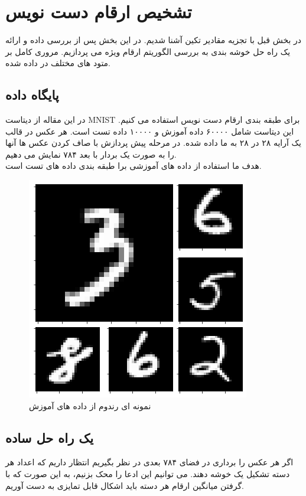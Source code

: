 	\section{تشخیص ارقام دست نویس}
	در بخش قبل با تجزیه مقادیر تکین آشنا شدیم. در این بخش 
	پس از بررسی داده و ارائه یک راه حل خوشه بندی به بررسی الگوریتم ارقام ویژه  می پردازیم. مروری کامل بر متود های مختلف در \cite{lecun} داده شده. 
	\subsection{پایگاه داده}
	در این مقاله از دیتاست MNIST  برای طبقه بندی ارقام دست نویس استفاده می کنیم.  
	این دیتاست شامل ۶۰۰۰۰ داده آموزش  و ۱۰۰۰۰ داده تست   است. هر عکس در قالب یک آرایه ۲۸ در ۲۸ به ما داده شده. در مرحله پیش پردازش با صاف  کردن عکس ها آنها را به صورت یک بردار با بعد ۷۸۴ نمایش می دهیم.\\
	هدف ما استفاده از داده های آموزشی برا طبقه بندی داده های تست است.
	 	 
	\begin{figure}[h]
		\centering
		\includegraphics[width=0.7\linewidth]{assets/sample.png}
		\caption{ نمونه ای رندوم از داده های آموزش}
	\end{figure}

	
	\subsection{یک راه حل ساده}
	اگر هر عکس را برداری در فضای ۷۸۴ بعدی در نظر بگیریم انتظار داریم که اعداد هر دسته تشکیل یک خوشه  دهند. می توانیم این ادعا را محک بزنیم، به این صورت که با گرفتن میانگین  ارقام هر دسته باید اشکال قابل تمایزی به دست آوریم.
	
